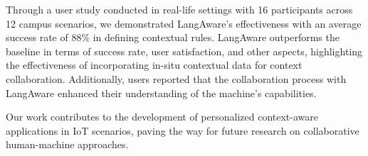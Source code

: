 Through a user study conducted in real-life settings with 16 participants across 12 campus scenarios, we demonstrated LangAware's effectiveness with an average success rate of 88\% in defining contextual rules.
LangAware outperforms the baseline in terms of success rate, user satisfaction, and other aspects, highlighting the effectiveness of incorporating in-situ contextual data for context collaboration.
Additionally, users reported that the collaboration process with LangAware enhanced their understanding of the machine's capabilities.

Our work contributes to the development of personalized context-aware applications in IoT scenarios, paving the way for future research on collaborative human-machine approaches.






